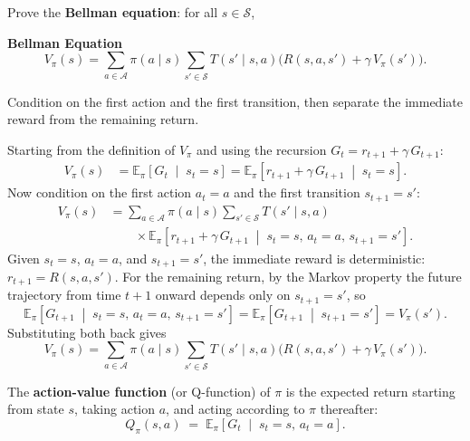 \documentclass[11pt]{article}
\newcommand{\cS}{\mathcal{S}}
\newcommand{\cA}{\mathcal{A}}
\begin{document}
\begin{exercise}
\label{prob:bellman_proof} Prove the \textbf{Bellman equation}: for all $s \in \cS$,
\begin{callout}[note]
\textbf{Bellman Equation}
$$
V_\pi(s) = \sum_{a \in \cA} \pi(a \mid s) \sum_{s' \in \cS} T(s' \mid s, a)\bigl(R(s,a,s') + \gamma\, V_\pi(s')\bigr).
$$
\end{callout}
\begin{hint}
Condition on the first action and the first transition, then separate the immediate reward from the remaining return.
\end{hint}
\end{exercise}

\begin{solution}
Starting from the definition of $V_\pi$ and using the recursion $G_t = r_{t+1} + \gamma\, G_{t+1}$:
\begin{align*}
V_\pi(s) &= \mathbb{E}_\pi\!\left[G_t \;\middle|\; s_t = s\right] = \mathbb{E}_\pi\!\left[r_{t+1} + \gamma\, G_{t+1} \;\middle|\; s_t = s\right].
\end{align*}
Now condition on the first action $a_t = a$ and the first transition $s_{t+1} = s'$:
\begin{align*}
V_\pi(s) &= \sum_{a \in \cA} \pi(a \mid s) \sum_{s' \in \cS} T(s' \mid s, a) \\
&\qquad \times \mathbb{E}_\pi\!\left[r_{t+1} + \gamma\, G_{t+1} \;\middle|\; s_t = s,\, a_t = a,\, s_{t+1} = s'\right].
\end{align*}
Given $s_t = s$, $a_t = a$, and $s_{t+1} = s'$, the immediate reward is deterministic: $r_{t+1} = R(s, a, s')$. For the remaining return, by the Markov property the future trajectory from time $t+1$ onward depends only on $s_{t+1} = s'$, so
$$
\mathbb{E}_\pi\!\left[G_{t+1} \;\middle|\; s_t = s,\, a_t = a,\, s_{t+1} = s'\right] = \mathbb{E}_\pi\!\left[G_{t+1} \;\middle|\; s_{t+1} = s'\right] = V_\pi(s').
$$
Substituting both back gives
$$
V_\pi(s) = \sum_{a \in \cA} \pi(a \mid s) \sum_{s' \in \cS} T(s' \mid s, a)\bigl(R(s,a,s') + \gamma\, V_\pi(s')\bigr).
$$
\end{solution}

\begin{definition}\label{def:q_function}
The \textbf{action-value function} (or Q-function) of $\pi$ is the expected return starting from state $s$, taking action $a$, and acting according to $\pi$ thereafter:
$$
Q_\pi(s,a) \;=\; \mathbb{E}_\pi\!\left[G_t \;\middle|\; s_t = s,\, a_t = a\right].
$$
\end{definition}
\end{document}
